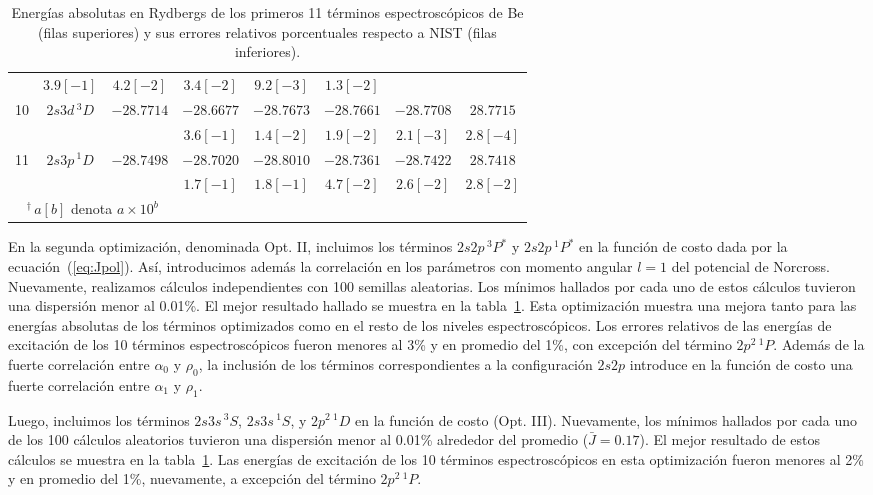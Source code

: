\begin{table}
\begin{tabular}{|*{8}{c|}}
  & $3.9[-1]$   & $4.2[-2]$  & $3.4[-2]$  & $9.2[-3]$  & $1.3[-2]$ \\  
\rowcolor{mygray} 
10& $2s3d\,^3D$ & $-28.7714$ 
  & $-28.6677$  & $-28.7673$ & $-28.7661$ & $-28.7708$ & $28.7715$ \\ & & 
  & $3.6[-1]$   & $1.4[-2]$  & $1.9[-2]$  & $2.1[-3]$  & $2.8[-4]$ \\  
\rowcolor{mygray} 
11& $2s3p\,^1D$ & $-28.7498$ 
  & $-28.7020$  & $-28.8010$ & $-28.7361$ & $-28.7422$ & $28.7418$ \\ & & 
  & $1.7[-1]$   & $1.8[-1]$  & $4.7[-2]$  & $2.6[-2]$  & $2.8[-2]$ \\ 
\hline\multicolumn{3}{c}{$\,^{\dagger}\,a[b]$ denota $a\times 10^b$} \\
\end{tabular}
\caption[Energías absolutas de Be.]
{Energías absolutas en Rydbergs de los primeros 11 términos 
espectroscópicos de Be (filas superiores) y sus errores relativos 
porcentuales respecto a NIST (filas inferiores).}
\label{tab:optpol}
\end{table}

En la segunda optimización, denominada Opt. II, incluimos los términos 
$2s2p\,^3P^*$ y $2s2p\,^1P^*$ en la función de costo dada por la 
ecuación~(\ref{eq:Jpol}). Así, introducimos además la correlación en los 
parámetros con momento angular $l=1$ del potencial de Norcross. 
Nuevamente, realizamos cálculos independientes con 100 semillas aleatorias. 
Los mínimos hallados por cada uno de estos cálculos tuvieron una 
dispersión menor al 0.01\%. El mejor resultado hallado se muestra en la 
tabla~\ref{tab:optpol}. Esta optimización muestra una mejora tanto para 
las energías absolutas de los términos optimizados como en el resto de 
los niveles espectroscópicos. Los errores relativos de las energías de 
excitación de los 10 términos espectroscópicos fueron menores al 3\% y en 
promedio del 1\%, con excepción del término $2p^2\,^1P$. Además de la 
fuerte correlación entre $\alpha_0$ y $\rho_0$, la inclusión de los 
términos correspondientes a la configuración $2s2p$ introduce en la 
función de costo una fuerte correlación entre $\alpha_1$ y $\rho_1$.

Luego, incluimos los términos $2s3s\,^3S$, $2s3s\,^1S$, y $2p^2\,^1D$ en 
la función de costo (Opt. III). Nuevamente, los mínimos hallados por cada 
uno de los 100 cálculos aleatorios tuvieron una dispersión menor al 
0.01\% alrededor del promedio ($\bar{J}=0.17$). El mejor resultado de 
estos cálculos se muestra en la tabla~\ref{tab:optpol}. Las energías de 
excitación de los 10 términos espectroscópicos en esta optimización 
fueron menores al 2\% y en promedio del 1\%, nuevamente, a excepción del 
término $2p^2\,^1P$. 

